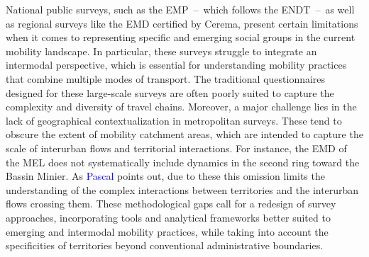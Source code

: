 \begin{refsegment}
National public surveys, such as the \acrfull{EMP}~–~which follows the \acrfull{ENDT}~–~as well as regional surveys like the \acrfull{EMD} certified by \acrshort{Cerema}, present certain limitations when it comes to representing specific and emerging social groups in the current mobility landscape. In particular, these surveys struggle to integrate an intermodal perspective, which is essential for understanding mobility practices that combine multiple modes of transport. The traditional questionnaires designed for these large-scale surveys are often poorly suited to capture the complexity and diversity of travel chains. Moreover, a major challenge lies in the lack of geographical contextualization in metropolitan surveys. These tend to obscure the extent of mobility catchment areas, which are intended to capture the scale of interurban flows and territorial interactions. For instance, the \acrshort{EMD} of the \acrshort{MEL} does not systematically include dynamics in the second ring toward the Bassin Minier. As \textcolor{blue}{Pascal} \textcolor{blue}{\textcite[29-30]{gabet_etude_2004}} points out, due to these  this omission limits the understanding of the complex interactions between territories and the interurban flows crossing them. These methodological gaps call for a redesign of survey approaches, incorporating tools and analytical frameworks better suited to emerging and intermodal mobility practices, while taking into account the specificities of territories beyond conventional administrative boundaries.%


\end{refsegment}
